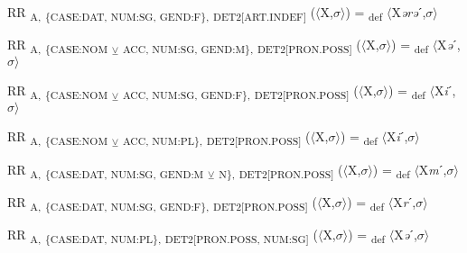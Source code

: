 {\begin{exe}
 RR \textsubscript{A,} \textsubscript{\{CASE:DAT, NUM:SG, GEND:F\},} \textsubscript{DET2[ART.INDEF]} ($\langle$X,$\sigma $$\rangle$) = \textsubscript{def} $\langle$X\textit{ərə}ˊ,$\sigma $$\rangle$
\end{exe}

\begin{exe}
 RR \textsubscript{A,} \textsubscript{\{CASE:NOM} \textsubscript{${\veebar}$}\textsubscript{ ACC, NUM:SG, GEND:M\},} \textsubscript{DET2[PRON.POSS]} ($\langle$X,$\sigma $$\rangle$) = \textsubscript{def} $\langle$X\textit{ə}ˊ,$\sigma $$\rangle$
\end{exe}

\begin{exe}
 RR \textsubscript{A,} \textsubscript{\{CASE:NOM} \textsubscript{${\veebar}$}\textsubscript{ ACC, NUM:SG, GEND:F\},} \textsubscript{DET2[PRON.POSS]} ($\langle$X,$\sigma $$\rangle$) = \textsubscript{def} $\langle$X\textit{i}ˊ,$\sigma $$\rangle$
\end{exe}

\begin{exe}
 RR \textsubscript{A,} \textsubscript{\{CASE:NOM} \textsubscript{${\veebar}$}\textsubscript{ ACC, NUM:PL\},} \textsubscript{DET2[PRON.POSS]} ($\langle$X,$\sigma $$\rangle$) = \textsubscript{def} $\langle$X\textit{i}ˊ,$\sigma $$\rangle$
\end{exe}

\begin{exe}
 RR \textsubscript{A,} \textsubscript{\{CASE:DAT, NUM:SG, GEND:M} \textsubscript{${\veebar}$}\textsubscript{ N\},} \textsubscript{DET2[PRON.POSS]} ($\langle$X,$\sigma $$\rangle$) = \textsubscript{def} $\langle$X\textit{m}ˊ,$\sigma $$\rangle$
\end{exe}

\begin{exe}
 RR \textsubscript{A,} \textsubscript{\{CASE:DAT, NUM:SG, GEND:F\},} \textsubscript{DET2[PRON.POSS]} ($\langle$X,$\sigma $$\rangle$) = \textsubscript{def} $\langle$X\textit{r}ˊ,$\sigma $$\rangle$
\end{exe}

\begin{exe}
 RR \textsubscript{A,} \textsubscript{\{CASE:DAT, NUM:PL\},} \textsubscript{DET2[PRON.POSS, NUM:SG]} ($\langle$X,$\sigma $$\rangle$) = \textsubscript{def} $\langle$X\textit{ə}ˊ,$\sigma $$\rangle$
\end{exe}

}
